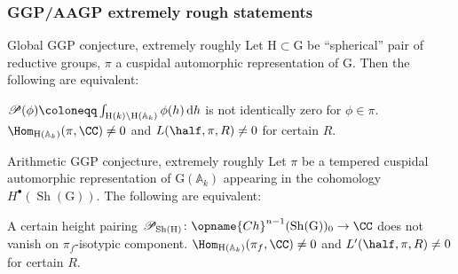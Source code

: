 \documentclass[11pt]{beamer}
\DeclareMathOperator{\Sh}{Sh}
\newcommand{\G}{\mathrm{G}}
\renewcommand{\H}{\mathrm{H}}
\begin{document}
\begin{frame}
  \frametitle{GGP/AAGP extremely rough statements}
  \begin{exampleblock}{Global GGP conjecture, extremely roughly}
    Let $\H \subset \G$ be ``spherical'' pair of reductive groups,
    $\pi$ a cuspidal automorphic representation of $\G$.
    Then the following are equivalent:
    \begin{enumerate}
      \ii $\mathscr P(\phi) \coloneqq \int_{\H(k) \backslash \H(\mathbb A_k)} \phi(h) \odif h$
      is not identically zero for $\phi \in \pi$.
      \ii $\Hom_{\H(\mathbb A_k)}(\pi, \CC) \neq 0$ and $L(\half, \pi , R) \neq 0$
      for certain $R$.
    \end{enumerate}
  \end{exampleblock}
  \begin{exampleblock}{Arithmetic GGP conjecture, extremely roughly}
    Let $\pi$ be a tempered cuspidal automorphic representation of $\G(\mathbb A_k)$
    appearing in the cohomology $H^\bullet(\Sh(\G))$.
    The following are equivalent:
    \begin{enumerate}
      \ii A certain height pairing
      $\mathscr{P}_{\Sh(\H)} \colon \opname{Ch}^{n-1}(\Sh(\G))_0 \to \CC$
      does not vanish on $\pi_f$-isotypic component.
      \ii $\Hom_{\H(\mathbb{A}_k)}(\pi_f, \CC) \neq 0$
      and $L'(\half, \pi, R) \neq 0$ for certain $R$.
    \end{enumerate}
  \end{exampleblock}
\end{frame}
\end{document}
